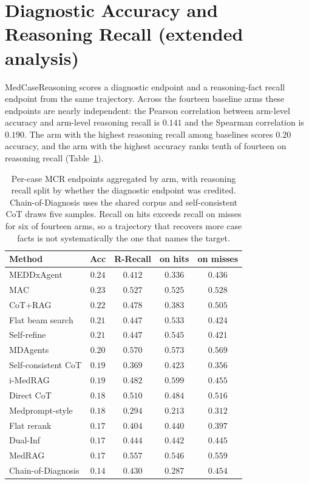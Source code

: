 \documentclass[letterpaper]{article}
\begin{document}
\section{Diagnostic Accuracy and Reasoning Recall (extended analysis)}
\label{sec:decoupling}

MedCaseReasoning scores a diagnostic endpoint and a reasoning-fact recall endpoint from the same trajectory.
Across the fourteen baseline arms these endpoints are nearly independent: the Pearson correlation between arm-level accuracy and arm-level reasoning recall is $0.141$ and the Spearman correlation is $0.190$.
The arm with the highest reasoning recall among baselines scores $0.20$ accuracy, and the arm with the highest accuracy ranks tenth of fourteen on reasoning recall (Table~\ref{tab:decoupling}).

\begin{table}[tb]
\centering
\footnotesize
\setlength{\tabcolsep}{3pt}
\begin{tabular}{@{}lcccc@{}}
\toprule
Method & Acc & R-Recall & on hits & on misses \\
\midrule
MEDDxAgent & $0.24$ & $0.412$ & $0.336$ & $0.436$ \\
MAC & $0.23$ & $0.527$ & $0.525$ & $0.528$ \\
CoT+RAG & $0.22$ & $0.478$ & $0.383$ & $0.505$ \\
Flat beam search & $0.21$ & $0.447$ & $0.533$ & $0.424$ \\
Self-refine & $0.21$ & $0.447$ & $0.545$ & $0.421$ \\
MDAgents & $0.20$ & $0.570$ & $0.573$ & $0.569$ \\
Self-consistent CoT & $0.19$ & $0.369$ & $0.423$ & $0.356$ \\
i-MedRAG & $0.19$ & $0.482$ & $0.599$ & $0.455$ \\
Direct CoT & $0.18$ & $0.510$ & $0.484$ & $0.516$ \\
Medprompt-style & $0.18$ & $0.294$ & $0.213$ & $0.312$ \\
Flat rerank & $0.17$ & $0.404$ & $0.440$ & $0.397$ \\
Dual-Inf & $0.17$ & $0.444$ & $0.442$ & $0.445$ \\
MedRAG & $0.17$ & $0.557$ & $0.546$ & $0.559$ \\
Chain-of-Diagnosis & $0.14$ & $0.430$ & $0.287$ & $0.454$ \\
\bottomrule
\end{tabular}
\caption{Per-case MCR endpoints aggregated by arm, with reasoning recall split by whether the diagnostic endpoint was credited. Chain-of-Diagnosis uses the shared corpus and self-consistent CoT draws five samples. Recall on hits exceeds recall on misses for six of fourteen arms, so a trajectory that recovers more case facts is not systematically the one that names the target.}
\label{tab:decoupling}
\end{table}
\end{document}
